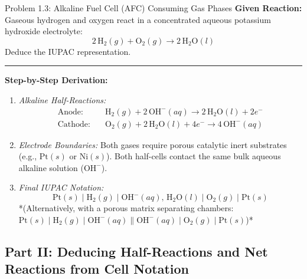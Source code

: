 \documentclass[10pt,a4paper]{article}
\begin{document}
\begin{examplebox}{Problem 1.3: Alkaline Fuel Cell (AFC) Consuming Gas Phases}
\textbf{Given Reaction:}
Gaseous hydrogen and oxygen react in a concentrated aqueous potassium hydroxide electrolyte:
\begin{equation*}
    2\,\text{H}_2(g) + \text{O}_2(g) \longrightarrow 2\,\text{H}_2\text{O}(l)
\end{equation*}
Deduce the IUPAC representation.

\vspace{0.3cm}\hrule\vspace{0.3cm}
\textbf{Step-by-Step Derivation:}
\begin{enumerate}
    \item \textit{Alkaline Half-Reactions:}
    \begin{align*}
        \text{Anode:} \quad & \text{H}_2(g) + 2\,\text{OH}^-(aq) \longrightarrow 2\,\text{H}_2\text{O}(l) + 2e^- \\
        \text{Cathode:} \quad & \text{O}_2(g) + 2\,\text{H}_2\text{O}(l) + 4e^- \longrightarrow 4\,\text{OH}^-(aq)
    \end{align*}
    \item \textit{Electrode Boundaries:} Both gases require porous catalytic inert substrates (e.g., $\text{Pt}(s)$ or $\text{Ni}(s)$). Both half-cells contact the same bulk aqueous alkaline solution ($\text{OH}^-$).
    \item \textit{Final IUPAC Notation:}
    $$\text{Pt}(s) \mid \text{H}_2(g) \mid \text{OH}^-(aq),\, \text{H}_2\text{O}(l) \mid \text{O}_2(g) \mid \text{Pt}(s)$$
    *(Alternatively, with a porous matrix separating chambers: $\text{Pt}(s) \mid \text{H}_2(g) \mid \text{OH}^-(aq) \parallel \text{OH}^-(aq) \mid \text{O}_2(g) \mid \text{Pt}(s)$)*
\end{enumerate}
\end{examplebox}

\subsection{Part II: Deducing Half-Reactions and Net Reactions from Cell Notation}
\end{document}

